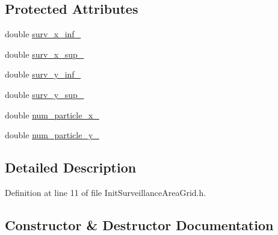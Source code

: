 \subsection*{Protected Attributes}
\begin{DoxyCompactItemize}
\item 
double \mbox{\hyperlink{classbfl_1_1InitSurveillanceAreaGrid_a1c702aae61274aa407f020844cffc6bf}{surv\+\_\+x\+\_\+inf\+\_\+}}
\item 
double \mbox{\hyperlink{classbfl_1_1InitSurveillanceAreaGrid_a14c1c6a5c620199a79c044c880f9ff99}{surv\+\_\+x\+\_\+sup\+\_\+}}
\item 
double \mbox{\hyperlink{classbfl_1_1InitSurveillanceAreaGrid_aea5684bc0f7880a1f9d8372969fd38cd}{surv\+\_\+y\+\_\+inf\+\_\+}}
\item 
double \mbox{\hyperlink{classbfl_1_1InitSurveillanceAreaGrid_ae0df87ad8b64ec5cd2d2bc5da6d4e47f}{surv\+\_\+y\+\_\+sup\+\_\+}}
\item 
double \mbox{\hyperlink{classbfl_1_1InitSurveillanceAreaGrid_a9bba0cb16db162afd37d3c1c33ce3a5c}{num\+\_\+particle\+\_\+x\+\_\+}}
\item 
double \mbox{\hyperlink{classbfl_1_1InitSurveillanceAreaGrid_ab218d6bffd6bbc9ca51eff2adcc03074}{num\+\_\+particle\+\_\+y\+\_\+}}
\end{DoxyCompactItemize}


\subsection{Detailed Description}


Definition at line 11 of file Init\+Surveillance\+Area\+Grid.\+h.



\subsection{Constructor \& Destructor Documentation}
\mbox{\label{classbfl_1_1InitSurveillanceAreaGrid_aef76c5f20e40fce325f8d79c36488816}} 
